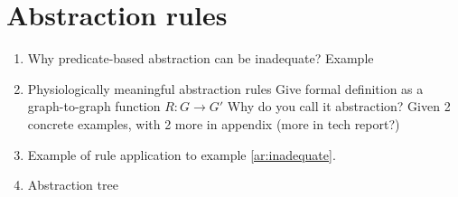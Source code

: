 \section{Abstraction rules}
\label{abstractionRules}

\begin{enumerate}
	\item Why predicate-based abstraction can be inadequate? Example
	\label{ar:inadequate}
	\item Physiologically meaningful abstraction rules
	\subitem Give formal definition as a graph-to-graph function $R: G \rightarrow G'$ 
	\subitem Why do you call it abstraction? 
	\subitem Given 2 concrete examples, with 2 more in appendix (more in tech report?)
	\item Example of rule application to example \ref{ar:inadequate}.
	\item Abstraction tree		
\end{enumerate}




